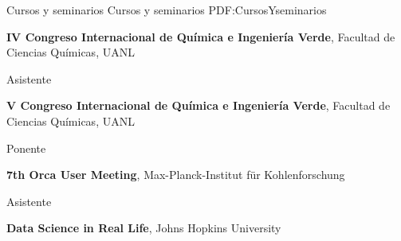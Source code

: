 \Section
{Cursos y seminarios}
{Cursos y seminarios}
{PDF:CursosYseminarios}

\Entry
{\textbf{IV Congreso Internacional de Química e Ingeniería Verde}},
\newline
Facultad de Ciencias Químicas, UANL

\Gap
\BulletItem
Asistente
\hfill
{}

\Entry
{\textbf{V Congreso Internacional de Química e Ingeniería Verde}},
\newline
Facultad de Ciencias Químicas, UANL

\Gap
\BulletItem
Ponente 
\hfill
{}

\Entry
{\textbf{7th Orca User Meeting}},
\newline
Max-Planck-Institut für Kohlenforschung

\Gap
\BulletItem
Asistente
\hfill
{}

\Entry
{\textbf{Data Science in Real Life}},
\newline
Johns Hopkins University
\hfill
{}